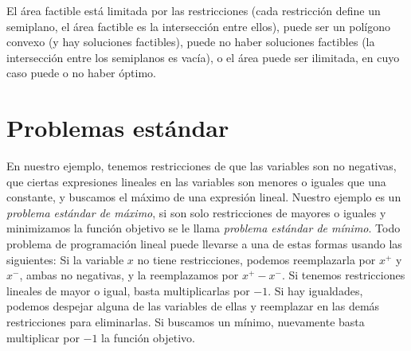   El área factible está limitada por las restricciones
  (cada restricción define un semiplano,
   el área factible es la intersección entre ellos),
  puede ser un polígono convexo
  (y hay soluciones factibles),
  puede no haber soluciones factibles
  (la intersección entre los semiplanos es vacía),
  o el área puede ser ilimitada,
  en cuyo caso puede o no haber óptimo.

\section{Problemas estándar}
\label{sec:problemas-estandar}

  En nuestro ejemplo,
  tenemos restricciones de que las variables son no negativas,
  que ciertas expresiones lineales en las variables
  son menores o iguales que una constante,
  y buscamos el máximo de una expresión lineal.
  Nuestro ejemplo es un \emph{problema estándar de máximo},
  si son solo restricciones de mayores o iguales
  y minimizamos la función objetivo
  se le llama \emph{problema estándar de mínimo}.
  Todo problema de programación lineal puede llevarse a una de estas formas
  usando las siguientes:
  Si la variable \(x\) no tiene restricciones,
  podemos reemplazarla por \(x^+\) y \(x^-\),
  ambas no negativas,
  y la reemplazamos por \(x^+ - x^-\).
  Si tenemos restricciones lineales de mayor o igual,
  basta multiplicarlas por \(-1\).
  Si hay igualdades,
  podemos despejar alguna de las variables de ellas
  y reemplazar en las demás restricciones para eliminarlas.
  Si buscamos un mínimo,
  nuevamente basta multiplicar por \(-1\) la función objetivo.

